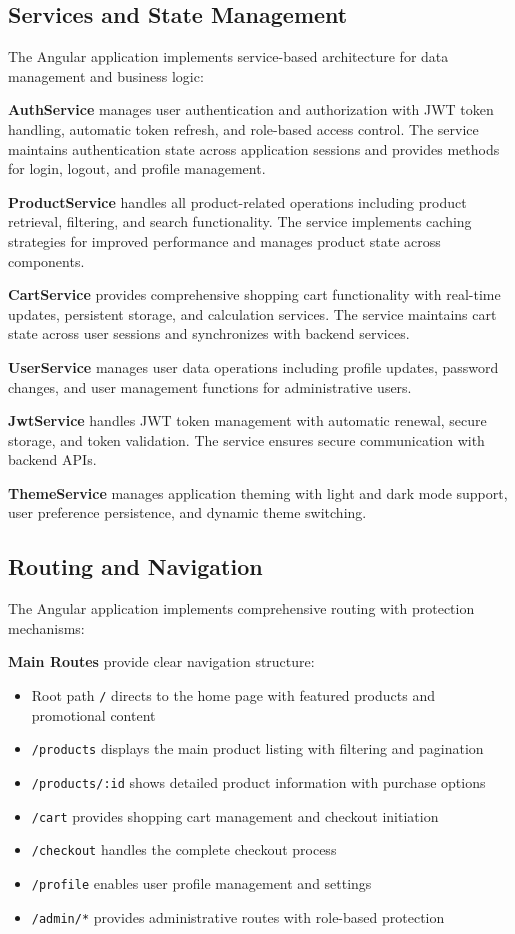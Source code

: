 \documentclass[12pt,a4paper]{article}
\begin{document}
\subsection{Services and State Management}

The Angular application implements service-based architecture for data management and business logic:

\textbf{AuthService} manages user authentication and authorization with JWT token handling, automatic token refresh, and role-based access control. The service maintains authentication state across application sessions and provides methods for login, logout, and profile management.

\textbf{ProductService} handles all product-related operations including product retrieval, filtering, and search functionality. The service implements caching strategies for improved performance and manages product state across components.

\textbf{CartService} provides comprehensive shopping cart functionality with real-time updates, persistent storage, and calculation services. The service maintains cart state across user sessions and synchronizes with backend services.

\textbf{UserService} manages user data operations including profile updates, password changes, and user management functions for administrative users.

\textbf{JwtService} handles JWT token management with automatic renewal, secure storage, and token validation. The service ensures secure communication with backend APIs.

\textbf{ThemeService} manages application theming with light and dark mode support, user preference persistence, and dynamic theme switching.

\subsection{Routing and Navigation}

The Angular application implements comprehensive routing with protection mechanisms:

\textbf{Main Routes} provide clear navigation structure:
\begin{itemize}
    \item Root path \texttt{/} directs to the home page with featured products and promotional content
    \item \texttt{/products} displays the main product listing with filtering and pagination
    \item \texttt{/products/:id} shows detailed product information with purchase options
    \item \texttt{/cart} provides shopping cart management and checkout initiation
    \item \texttt{/checkout} handles the complete checkout process
    \item \texttt{/profile} enables user profile management and settings
    \item \texttt{/admin/*} provides administrative routes with role-based protection
\end{itemize}
\end{document}
